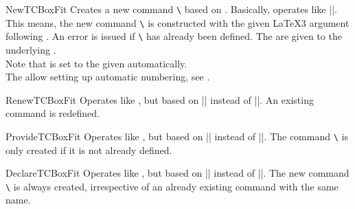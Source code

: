 \clearpage

\begin{docCommand}{NewTCBoxFit}{}
  Creates a new command \texttt{\textbackslash} based on .
  Basically,  operates like |\NewDocumentCommand|. This means,
  the new command \texttt{\textbackslash} is constructed with the given
  \LaTeX3 argument  following \cite{latexproject:usrguide}.
  An error is issued if \texttt{\textbackslash} has already been defined.
  The  are given to the underlying .\\
  Note that  is set to the given 
  automatically.\\
  The  allow setting up automatic numbering,
  see .

\end{docCommand}

\begin{docCommand}{RenewTCBoxFit}{}
  Operates like , but based on |\RenewDocumentCommand| instead of |\NewDocumentCommand|.
  An existing command is redefined.
\end{docCommand}

\begin{docCommand}{ProvideTCBoxFit}{}
  Operates like , but based on |\ProvideDocumentCommand| instead of |\NewDocumentCommand|.
  The command \texttt{\textbackslash} is only created if it is not already defined.
\end{docCommand}

\begin{docCommand}{DeclareTCBoxFit}{}
  Operates like , but based on |\DeclareDocumentCommand| instead of |\NewDocumentCommand|.
  The new command \texttt{\textbackslash} is always created, irrespective of an already existing
  command with the same name.
\end{docCommand}

